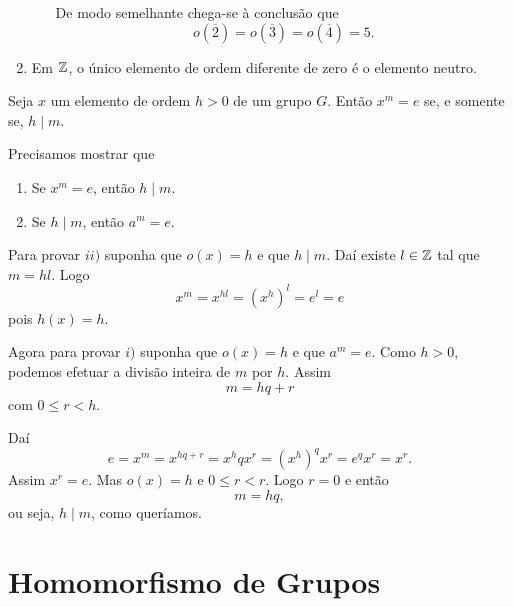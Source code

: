 \begin{exemplos}
\begin{enumerate}[label={\arabic*})]
\begin{itemize}
            De modo semelhante chega-se à conclusão que
            \[
                o(\overline{2}) = o(\overline{3}) = o(\overline{4}) = 5.
            \]
        \end{itemize}

        \item Em $\mathbb{Z}$, o único elemento de ordem diferente de zero é o elemento neutro.
    \end{enumerate}
\end{exemplos}

\begin{proposicao}
    Seja $x$ um elemento de ordem $h > 0$ de um grupo $G$. Então $x^m = e$ se, e somente se, $h \mid m$.
\end{proposicao}
\begin{prova}
    Precisamos mostrar que
    \begin{enumerate}[label={\roman*})]
        \item Se $x^m = e$, então $h \mid m$.

        \item Se $h \mid m$, então $a^m = e$.
    \end{enumerate}

    Para provar $ii)$ suponha que $o(x) = h$ e que $h \mid m$. Daí existe $l \in \mathbb{Z}$ tal que $m = hl$. Logo
    \[
        x^m = x^{hl} = (x^h)^l = e^l = e
    \]
    pois $h(x) = h$.

    Agora para provar $i)$ suponha que $o(x) = h$ e que $a^m = e$. Como $h > 0$, podemos efetuar a divisão inteira de $m$ por $h$. Assim
    \[
        m = hq + r
    \]
    com $0 \le r < h$.

    Daí
    \[
        e = x^m = x^{hq + r} = x^hqx^r = (x^h)^qx^r = e^qx^r = x^r.
    \]
    Assim $x^r = e$. Mas $o(x) = h$ e $0 \le r < r$. Logo $r = 0$ e então
    \[
        m = hq,
    \]
    ou seja, $h \mid m$, como queríamos.
\end{prova}

\section{Homomorfismo de Grupos} %
\label{sec:homomorfismo_de_grupos}


